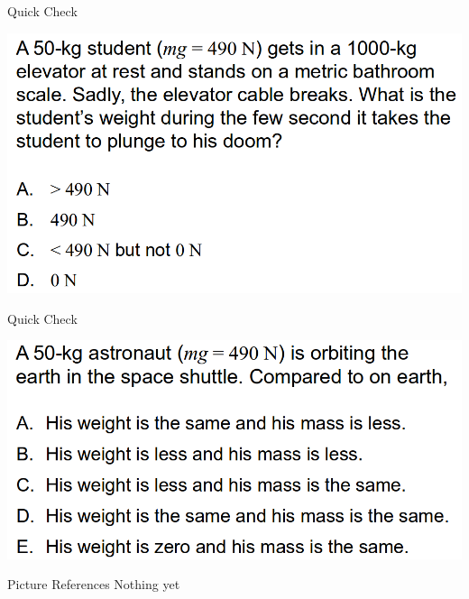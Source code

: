 \documentclass{beamer}
\newcommand{\red}[1]{{\color{red}{#1}}}
\newcommand{\checkL}[2]{\begin{textblock*}{1cm}(#1,#2){\Large \red{\Checkmark}}\end{textblock*}}
\begin{document}
\begin{frame}{Quick Check}
\begin{center}
   \includegraphics[width=\textwidth]{../figures/QC6_10.png}
\end{center}
\only<2>{\checkL{0.9cm}{7.2cm}}
\end{frame}

\begin{frame}{Quick Check}
\begin{center}
   \includegraphics[width=\textwidth]{../figures/QC6_11.png}
\end{center}
\only<2>{\checkL{0.9cm}{6.6cm}}
\end{frame}

\begin{frame}{Picture References}
\tiny
Nothing yet
\end{frame}
\end{document}
